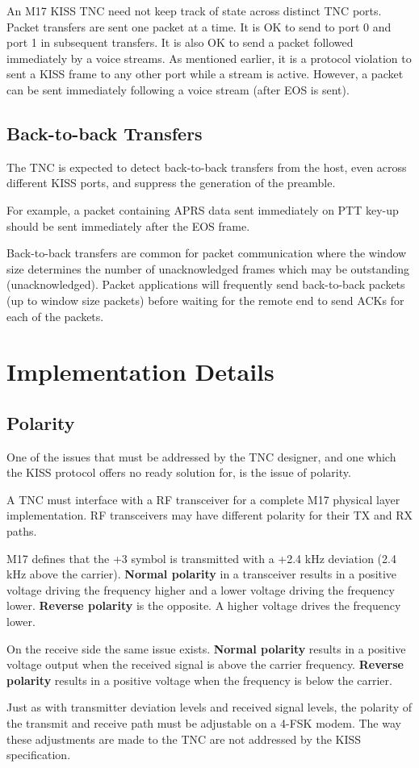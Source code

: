 \documentclass[a4paper,11pt,oneside]{article}
\begin{document}
An M17 KISS TNC need not keep track of state across distinct TNC ports. Packet transfers are sent one packet at a time. It is OK to send to port 0 and port 1 in subsequent transfers. It is also OK to send a packet followed immediately by a voice streams. As mentioned earlier, it is a protocol violation to sent a KISS frame to any other port while a stream is active. However, a packet can be sent immediately following a voice stream (after EOS is sent).

\subsection{Back-to-back Transfers}

The TNC is expected to detect back-to-back transfers from the host, even across different KISS ports, and suppress the generation of the preamble.

For example, a packet containing APRS data sent immediately on PTT key-up should be sent immediately after the EOS frame.

Back-to-back transfers are common for packet communication where the window size determines the number of unacknowledged frames which may be outstanding (unacknowledged). Packet applications will frequently send back-to-back packets (up to window size packets) before waiting for the remote end to send ACKs for each of the packets.

\section{Implementation Details}

\subsection{Polarity}

One of the issues that must be addressed by the TNC designer, and one which the KISS protocol offers no ready solution for, is the issue of polarity.

A TNC must interface with a RF transceiver for a complete M17 physical layer implementation. RF transceivers may have different polarity for their TX and RX paths.

M17 defines that the +3 symbol is transmitted with a +2.4 kHz deviation (2.4 kHz above the carrier). \textbf{Normal polarity} in a transceiver results in a positive voltage driving the frequency higher and a lower voltage driving the frequency lower. \textbf{Reverse polarity} is the opposite. A higher voltage drives the frequency lower.

On the receive side the same issue exists. \textbf{Normal polarity} results in a positive voltage output when the received signal is above the carrier frequency. \textbf{Reverse polarity} results in a positive voltage when the frequency is below the carrier.

Just as with transmitter deviation levels and received signal levels, the polarity of the transmit and receive path must be adjustable on a 4-FSK modem. The way these adjustments are made to the TNC are not addressed by the KISS specification.
\end{document}
